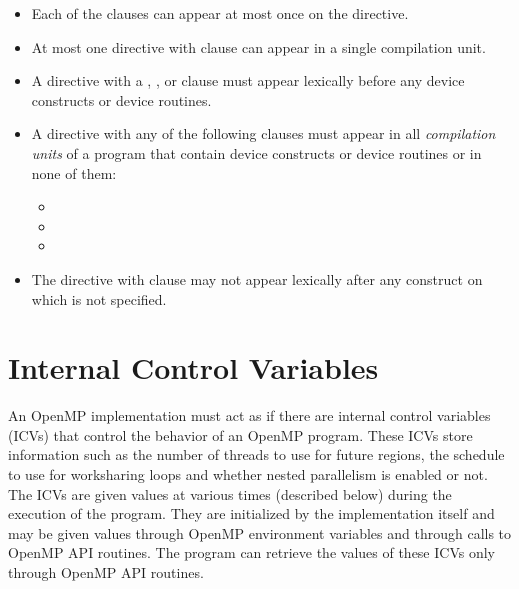 \begin{itemize}
\item Each of the clauses can appear at most once on the directive.
\item At most one  directive with  
      clause can appear in a single compilation unit.
\item A  directive with a ,
      , or  clause must 
      appear lexically before any device constructs or device routines.
\item A  directive with any of the following clauses must appear 
      in all \emph{compilation units} of a program that contain device
      constructs or device routines or in none of them:

\begin{itemize}
\item {}
\item {}
\item {}
\end{itemize}

\item The  directive with 
      clause may not appear lexically after any  construct on which
       is not specified.


\end{itemize}



\section{Internal Control Variables}
\label{sec:Internal Control Variables}

An OpenMP implementation must act as if there are internal control variables (ICVs)
that control the behavior of an OpenMP program. These ICVs store information such as
the number of threads to use for future  regions, the schedule to use 
for worksharing loops and whether nested parallelism is enabled or not. The ICVs are 
given values at various times (described below) during the execution of the program. 
They are initialized by the implementation itself and may be given values through 
OpenMP environment variables and through calls to OpenMP API routines. The program 
can retrieve the values of these ICVs only through OpenMP API routines.

